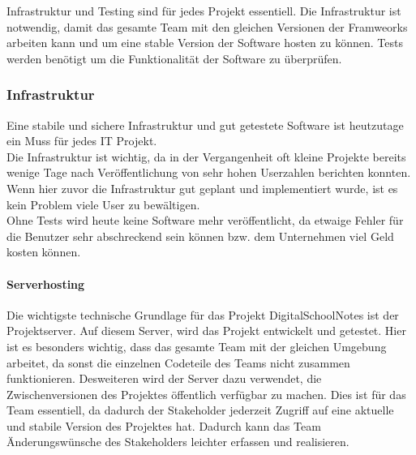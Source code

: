 
Infrastruktur und Testing sind für jedes Projekt essentiell. Die Infrastruktur ist notwendig, damit das gesamte Team mit den gleichen Versionen der Framweorks arbeiten kann und um eine stable Version der Software hosten zu können. Tests werden benötigt um die Funktionalität der Software zu überprüfen.
\subsubsection{Infrastruktur}
Eine stabile und sichere Infrastruktur und gut getestete Software ist heutzutage ein Muss für jedes IT Projekt. \\
Die Infrastruktur ist wichtig, da in der Vergangenheit oft kleine Projekte bereits wenige Tage nach Veröffentlichung von sehr hohen Userzahlen berichten konnten. Wenn hier zuvor die Infrastruktur gut geplant und implementiert wurde, ist es kein Problem viele User zu bewältigen.\\ 
Ohne Tests wird heute keine Software mehr veröffentlicht, da etwaige Fehler für die Benutzer sehr abschreckend sein können bzw. dem Unternehmen viel Geld kosten können.
\paragraph{Serverhosting}
Die wichtigste technische Grundlage für das Projekt DigitalSchoolNotes ist der Projektserver. Auf diesem Server, wird das Projekt entwickelt und getestet. Hier ist es besonders wichtig, dass das gesamte Team mit der gleichen Umgebung arbeitet, da sonst die einzelnen Codeteile des Teams nicht zusammen funktionieren. Desweiteren wird der Server dazu verwendet, die Zwischenversionen des Projektes öffentlich verfügbar zu machen. Dies ist für das Team essentiell, da dadurch der \gls{Stakeholder} jederzeit Zugriff auf eine aktuelle und stabile Version des Projektes hat. Dadurch kann das Team Änderungswünsche des Stakeholders leichter erfassen und realisieren.\\

\newpage

